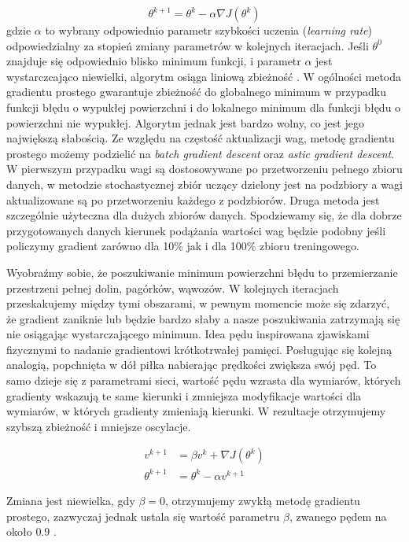 \documentclass[11pt]{book}
\theoremstyle{definition}
\begin{document}
\begin{equation}
\theta^{k+1} = \theta^{k} - \alpha \nabla J(\theta^{k})
\end{equation}
gdzie $\alpha$ to wybrany odpowiednio parametr szybkości uczenia (\textit{learning rate}) odpowiedzialny za stopień zmiany parametrów w kolejnych iteracjach. Jeśli $\theta^0$ znajduje się odpowiednio blisko minimum funkcji, i parametr $\alpha$ jest wystarczcająco niewielki, algorytm osiąga liniową zbieżność \cite{Dennis:1996:NMU:1096889}. W ogólności metoda gradientu prostego gwarantuje zbieżność do globalnego minimum w przypadku funkcji błędu o wypukłej powierzchni i do lokalnego minimum dla funkcji błędu o powierzchni nie wypukłej. Algorytm jednak jest bardzo wolny, co jest jego największą słabością. Ze względu na częstość aktualizacji wag, metodę gradientu prostego możemy podzielić na \textit{batch gradient descent} oraz \textit{astic gradient descent}. W pierwszym przypadku wagi są dostosowywane po przetworzeniu pełnego zbioru danych, w metodzie stochastycznej zbiór uczący dzielony jest na podzbiory a wagi aktualizowane są po przetworzeniu każdego z podzbiorów. Druga metoda jest szczególnie użyteczna dla dużych zbiorów danych. Spodziewamy się, że dla dobrze przygotowanych danych kierunek podążania wartości wag będzie podobny jeśli policzymy gradient zarówno dla 10\% jak i dla 100\% zbioru treningowego.


Wyobraźmy sobie, że poszukiwanie minimum powierzchni błędu to przemierzanie przestrzeni pełnej dolin, pagórków, wąwozów. W kolejnych iteracjach przeskakujemy między tymi obszarami, w pewnym momencie może się zdarzyć, że gradient zaniknie lub będzie bardzo słaby a nasze poszukiwania zatrzymają się nie osiągając wystarczającego minimum. Idea pędu inspirowana zjawiskami fizycznymi to nadanie gradientowi krótkotrwałej pamięci. Posługując się kolejną analogią, popchnięta w dół piłka nabierając prędkości zwiększa swój pęd. To samo dzieje się z parametrami sieci, wartość pędu wzrasta dla wymiarów, których gradienty wskazują te same kierunki i zmniejsza modyfikacje wartości dla wymiarów, w których gradienty zmieniają kierunki. W rezultacje otrzymujemy szybszą zbieżność i mniejsze oscylacje.

\begin{align} 
v^{k+1} &=  \beta v^{k}+ \nabla J(\theta^{k}) \\[0.4em]
\theta^{k+1} &=  \theta^{k }- \alpha v^{k+1}
\end{align}

Zmiana jest niewielka, gdy $\beta = 0$, otrzymujemy zwykłą metodę gradientu prostego, zazwyczaj jednak ustala się wartość parametru $\beta$, zwanego pędem na około $0.9$ \cite{1986Natur.323..533R}. 
\end{document}
